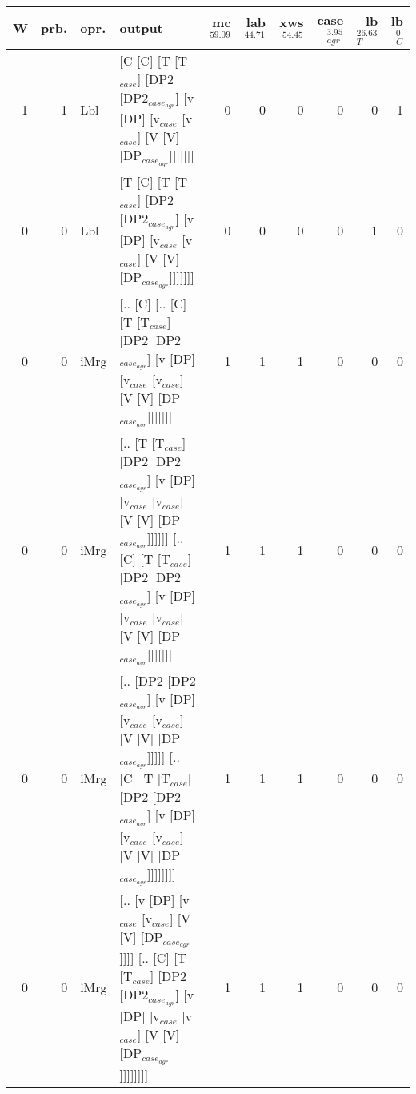 \begin{tabularx}{\linewidth}{rrlXrrrrrr}
\hline
   W &   prb. & opr.   & output                                                                                                                                                                              &   mc$^{59.09}$ &   lab$^{44.71}$ &   xws$^{54.45}$ &   case$_{agr}^{3.95}$ &   lb$_{T}^{26.63}$ &   lb$_{C}^{0}$ \\
\hline
   1 &   1 & Lbl  & [C [C] [T [T$_{case}$] [DP2 [DP2$_{case_{agr}}$] [v [DP] [v$_{case}$ [v$_{case}$] [V [V] [DP$_{case_{agr}}$]]]]]]]                                                                                          &            0 &             0 &             0 &                  0 &              0 &             1 \\
   0 &   0 & Lbl  & [T [C] [T [T$_{case}$] [DP2 [DP2$_{case_{agr}}$] [v [DP] [v$_{case}$ [v$_{case}$] [V [V] [DP$_{case_{agr}}$]]]]]]]                                                                                          &            0 &             0 &             0 &                  0 &              1 &             0 \\
   0 &   0 & iMrg & [.. [C] [.. [C] [T [T$_{case}$] [DP2 [DP2$_{case_{agr}}$] [v [DP] [v$_{case}$ [v$_{case}$] [V [V] [DP$_{case_{agr}}$]]]]]]]]                                                                                &            1 &             1 &             1 &                  0 &              0 &             0 \\
   0 &   0 & iMrg & [.. [T [T$_{case}$] [DP2 [DP2$_{case_{agr}}$] [v [DP] [v$_{case}$ [v$_{case}$] [V [V] [DP$_{case_{agr}}$]]]]]] [.. [C] [T [T$_{case}$] [DP2 [DP2$_{case_{agr}}$] [v [DP] [v$_{case}$ [v$_{case}$] [V [V] [DP$_{case_{agr}}$]]]]]]]] &            1 &             1 &             1 &                  0 &              0 &             0 \\
   0 &   0 & iMrg & [.. [DP2 [DP2$_{case_{agr}}$] [v [DP] [v$_{case}$ [v$_{case}$] [V [V] [DP$_{case_{agr}}$]]]]] [.. [C] [T [T$_{case}$] [DP2 [DP2$_{case_{agr}}$] [v [DP] [v$_{case}$ [v$_{case}$] [V [V] [DP$_{case_{agr}}$]]]]]]]]              &            1 &             1 &             1 &                  0 &              0 &             0 \\
   0 &   0 & iMrg & [.. [v [DP] [v$_{case}$ [v$_{case}$] [V [V] [DP$_{case_{agr}}$]]]] [.. [C] [T [T$_{case}$] [DP2 [DP2$_{case_{agr}}$] [v [DP] [v$_{case}$ [v$_{case}$] [V [V] [DP$_{case_{agr}}$]]]]]]]]                                   &            1 &             1 &             1 &                  0 &              0 &             0 \\

\end{tabularx}

